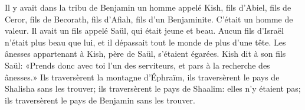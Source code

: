 Il y avait dans la tribu de Benjamin un homme appelé Kish,
	fils d’Abiel, fils de Ceror, fils de Becorath, fils d’Afiah, fils d’un Benjaminite.
	C’était un homme de valeur.
Il avait un fils appelé Saül, qui était jeune et beau.
	Aucun fils d’Israël n’était plus beau que lui,
	et il dépassait tout le monde de plus d’une tête.
Les ânesses appartenant à Kish, père de Saül, s’étaient égarées.
Kish dit à son fils Saül:
	«Prends donc avec toi l’un des serviteurs, et pars à la recherche des ânesses.»
Ils traversèrent la montagne d’Éphraïm,
	ils traversèrent le pays de Shalisha sans les trouver;
	ils traversèrent le pays de Shaalim: elles n’y étaient pas;
	ils traversèrent le pays de Benjamin sans les trouver.
